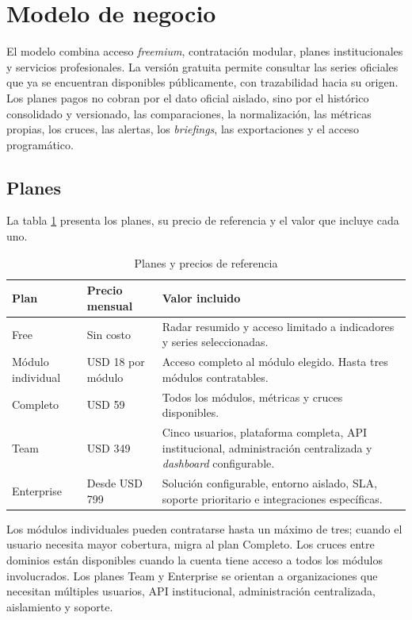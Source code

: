 \documentclass[11pt,a4paper]{article}
\begin{document}
\section{Modelo de negocio}
\label{sec:negocio}

El modelo combina acceso \emph{freemium}, contrataci\'on modular, planes
institucionales y servicios profesionales. La versi\'on gratuita permite
consultar las series oficiales que ya se encuentran disponibles p\'ublicamente,
con trazabilidad hacia su origen. Los planes pagos no cobran por el dato oficial
aislado, sino por el hist\'orico consolidado y versionado, las comparaciones, la
normalizaci\'on, las m\'etricas propias, los cruces, las alertas, los
\emph{briefings}, las exportaciones y el acceso program\'atico.

\subsection{Planes}

La tabla \ref{tab:planes} presenta los planes, su precio de referencia y el
valor que incluye cada uno.

\begin{table}[htbp]
\centering
\caption{Planes y precios de referencia}
\label{tab:planes}
\begin{tabularx}{\textwidth}{l l X}
\toprule
\textbf{Plan} & \textbf{Precio mensual} & \textbf{Valor incluido} \\
\midrule
Free              & Sin costo        & Radar resumido y acceso limitado a indicadores y series seleccionadas. \\
M\'odulo individual & USD 18 por m\'odulo & Acceso completo al m\'odulo elegido. Hasta tres m\'odulos contratables. \\
Completo          & USD 59           & Todos los m\'odulos, m\'etricas y cruces disponibles. \\
Team              & USD 349          & Cinco usuarios, plataforma completa, API institucional, administraci\'on centralizada y \emph{dashboard} configurable. \\
Enterprise        & Desde USD 799    & Soluci\'on configurable, entorno aislado, SLA, soporte prioritario e integraciones espec\'ificas. \\
\bottomrule
\end{tabularx}
\end{table}

Los m\'odulos individuales pueden contratarse hasta un m\'aximo de tres; cuando
el usuario necesita mayor cobertura, migra al plan Completo. Los cruces entre
dominios est\'an disponibles cuando la cuenta tiene acceso a todos los m\'odulos
involucrados. Los planes Team y Enterprise se orientan a organizaciones que
necesitan m\'ultiples usuarios, API institucional, administraci\'on
centralizada, aislamiento y soporte.
\end{document}

